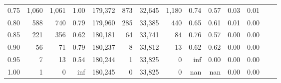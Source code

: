 \begin{tabular}{rrrrrrrrrrrrrr}
0.75 &   1,060 &  1,061 &    1.00 &  179,372 &      873 &  32,645 &   1,180 &  0.74 &  0.57 &  0.03 &      0.01 \\
0.80 &     588 &    740 &    0.79 &  179,960 &      285 &  33,385 &     440 &  0.65 &  0.61 &  0.01 &      0.00 \\
0.85 &     221 &    356 &    0.62 &  180,181 &       64 &  33,741 &      84 &  0.76 &  0.57 &  0.00 &      0.00 \\
0.90 &      56 &     71 &    0.79 &  180,237 &        8 &  33,812 &      13 &  0.62 &  0.62 &  0.00 &      0.00 \\
0.95 &       7 &     13 &    0.54 &  180,244 &        1 &  33,825 &       0 &   inf &  0.00 &  0.00 &      0.00 \\
1.00 &       1 &      0 &     inf &  180,245 &        0 &  33,825 &       0 &   nan &   nan &  0.00 &      0.00 \\
\bottomrule
\end{tabular}

